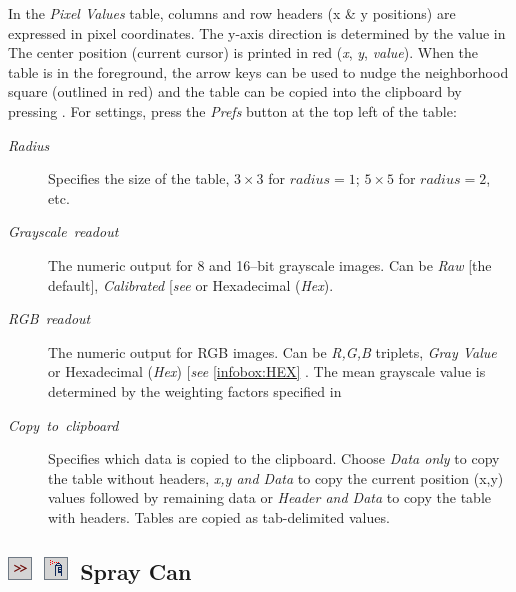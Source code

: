 In the \emph{Pixel Values} table, columns and row headers (x \& y
positions) are expressed in pixel coordinates. The y-axis direction
is determined by the  value in 
The center position (current cursor) is printed in red (\emph{x},
\emph{y}, \emph{value}). When the table is in the foreground, the
arrow keys can be used to nudge the neighborhood square (outlined
in red) and the table can be copied into the clipboard by pressing
. For settings, press the \emph{Prefs} button at the
top left of the table:
\begin{description}
\item [{\emph{Radius}}] Specifies the size of the table, $3\times3$ for
$radius=1$;  $5\times5$ for $radius=2$, etc. 
\item [{\emph{Grayscale\ readout}}] The numeric output for 8 and 16--bit
grayscale images. Can be\emph{ Raw} {[}the default{]}, \emph{Calibrated}
{[}\emph{see} \userinterface{Analyze\lyxarrow{}\nameref{sub:Calibrate...}}{]}
or Hexadecimal (\emph{Hex}).
\item [{\emph{RGB\ readout}}] The numeric output for RGB images. Can be
\emph{R,G,B} triplets, \emph{Gray Value} or Hexadecimal (\emph{Hex})
{[}\emph{see} \ref{infobox:HEX} \nameref{infobox:HEX}{]}. The mean
grayscale value is determined by the weighting factors specified in
\item [{\emph{Copy\ to\ clipboard}}] Specifies which data is copied to
the clipboard. Choose \emph{Data only} to copy the table without headers,
\emph{x,y and Data} to copy the current position (x,y) values followed
by remaining data or \emph{Header and Data} to copy the table with
headers. Tables are copied as tab-delimited values.
\end{description}



\subsection[Spray Can]{\noindent \textsf{\protect\includegraphics[bb=0bp 5bp 20bp 20bp,scale=0.6]{images/tools/Switcher}}~\textsf{\protect\includegraphics[bb=0bp 5bp 20bp 20bp,scale=0.6]{images/tools/SprayCan}}~Spray
Can\label{sub:SprayCan}\feature{}}

